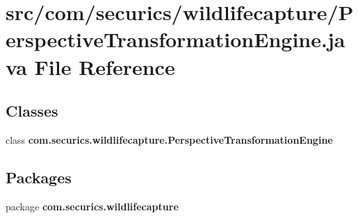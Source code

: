 \section{src/com/securics/wildlifecapture/\+Perspective\+Transformation\+Engine.java File Reference}
\label{_perspective_transformation_engine_8java}
\subsection*{Classes}
\begin{DoxyCompactItemize}
\item 
class {\bf com.\+securics.\+wildlifecapture.\+Perspective\+Transformation\+Engine}
\end{DoxyCompactItemize}
\subsection*{Packages}
\begin{DoxyCompactItemize}
\item 
package {\bf com.\+securics.\+wildlifecapture}
\end{DoxyCompactItemize}
